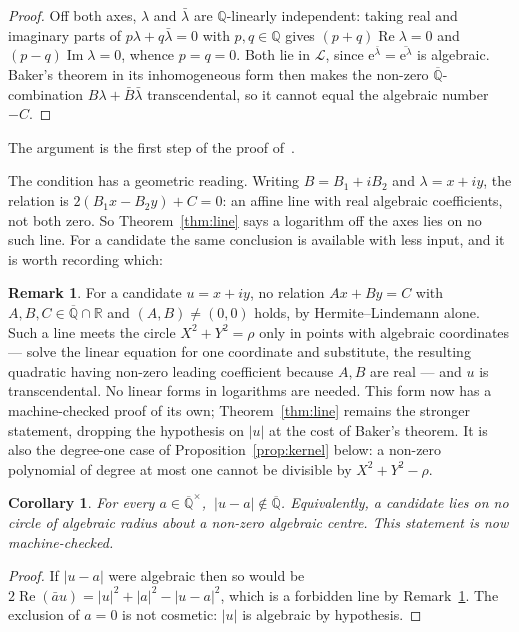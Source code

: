 \documentclass[11pt,a4paper]{article}
\theoremstyle{plain}
\newtheorem{corollary}[theorem]{Corollary}
\theoremstyle{definition}
\newtheorem{remark}[theorem]{Remark}
\newcommand{\e}{\mathrm{e}}
\newcommand{\Q}{\mathbb{Q}}
\newcommand{\R}{\mathbb{R}}
\newcommand{\Alg}{\overline{\mathbb{Q}}}
\newcommand{\Logs}{\mathcal{L}}
\begin{document}
\begin{proof}
Off both axes, $\lambda$ and $\bar\lambda$ are $\Q$-linearly independent: taking real and
imaginary parts of $p\lambda+q\bar\lambda=0$ with $p,q\in\Q$ gives
$(p+q)\operatorname{Re}\lambda=0$ and $(p-q)\operatorname{Im}\lambda=0$, whence $p=q=0$. Both lie
in $\Logs$, since $\e^{\bar\lambda}=\overline{\e^{\lambda}}$ is algebraic. Baker's theorem in its
inhomogeneous form then makes the non-zero $\Alg$-combination $B\lambda+\bar B\bar\lambda$
transcendental, so it cannot equal the algebraic number $-C$.
\end{proof}

The argument is the first step of the proof of~\cite[Th\'eor\`eme~3]{diaz-2004}.

The condition has a geometric reading. Writing $B=B_{1}+iB_{2}$ and $\lambda=x+iy$, the relation
is $2(B_{1}x-B_{2}y)+C=0$: an affine line with real algebraic coefficients, not both zero. So
Theorem~\ref{thm:line} says a logarithm off the axes lies on no such line. For a candidate the
same conclusion is available with less input, and it is worth recording which:

\begin{remark}\label{rem:line-cheap}
For a candidate $u=x+iy$, no relation $Ax+By=C$ with $A,B,C\in\Alg\cap\R$ and $(A,B)\neq(0,0)$
holds, by Hermite--Lindemann alone. Such a line meets the circle $X^{2}+Y^{2}=\rho$ only in
points with algebraic coordinates --- solve the linear equation for one coordinate and substitute,
the resulting quadratic having non-zero leading coefficient because $A,B$ are real --- and $u$ is
transcendental. No linear forms in logarithms are needed. This form now has a machine-checked
proof of its own; Theorem~\ref{thm:line} remains the stronger statement, dropping the hypothesis
on $|u|$ at the cost of Baker's theorem. It is also the degree-one case of
Proposition~\ref{prop:kernel} below: a non-zero polynomial of degree at most one cannot be
divisible by $X^{2}+Y^{2}-\rho$.
\end{remark}

\begin{corollary}\label{cor:distance}
For every $a\in\Alg^{\times}$, $\ |u-a|\notin\Alg$. Equivalently, a candidate lies on no circle
of algebraic radius about a non-zero algebraic centre. This statement is now machine-checked.
\end{corollary}

\begin{proof}
If $|u-a|$ were algebraic then so would be
$2\operatorname{Re}(\bar a u)=|u|^{2}+|a|^{2}-|u-a|^{2}$, which is a forbidden line by
Remark~\ref{rem:line-cheap}. The exclusion of $a=0$ is not cosmetic: $|u|$ is algebraic by
hypothesis.
\end{proof}
\end{document}
